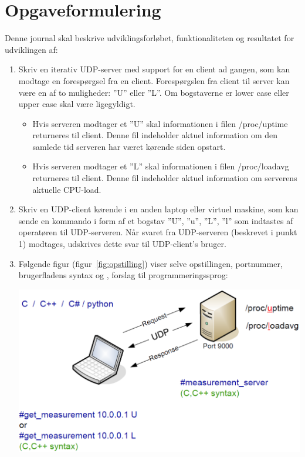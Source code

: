 \documentclass[12pt,fleqn,a4paper]{report}
\begin{document}
\section{Opgaveformulering}
Denne journal skal beskrive udviklingsforløbet, funktionaliteten og resultatet for udviklingen af:
\begin{enumerate}
	\item Skriv en iterativ UDP-server med support for en client ad gangen, som kan modtage en forespørgsel fra en client.
	Forespørgslen fra client til server kan være en af to muligheder: ”U” eller ”L”. Om bogstaverne er lower case eller upper case skal være ligegyldigt.
	\begin{itemize}
		\item Hvis serveren modtager et ”U” skal informationen i filen /proc/uptime
		returneres til client. Denne fil indeholder aktuel information om den samlede
		tid serveren har været kørende siden opstart.
		\item Hvis serveren modtager et ”L” skal informationen i filen /proc/loadavg
		returneres til client. Denne fil indeholder aktuel information om serverens aktuelle CPU-load.
	\end{itemize}
	
	\item Skriv en UDP-client kørende i en anden laptop eller virtuel maskine, som kan sende en kommando i form af et bogstav ”U”, ”u”, ”L”, ”l” som indtastes af operatøren til UDP-serveren. Når svaret fra UDP-serveren (beskrevet i punkt 1) modtages, udskrives dette svar til UDP-client’s bruger. 
	
	\item Følgende figur (figur~\ref{fig:opstilling}) viser selve opstillingen, portnummer, brugerfladens syntax og , forslag til programmeringssprog:
	\begin{center}
		\includegraphics[width=0.7 \textwidth]{opstilling.png}
		\label{fig:opstilling}
	\end{center}

\end{enumerate}
\end{document}
